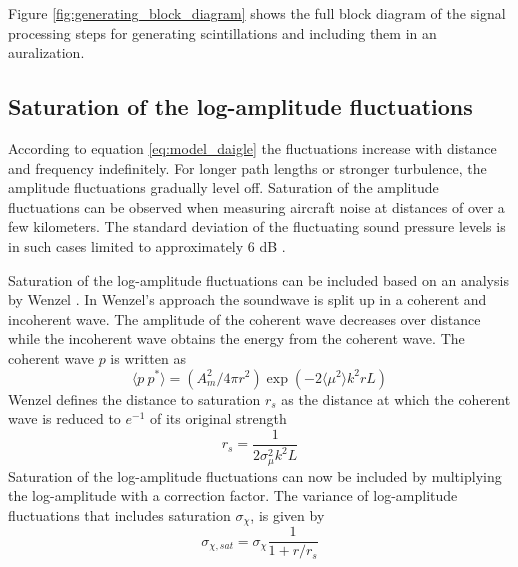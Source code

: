 Figure \ref{fig:generating_block_diagram} shows the full block diagram of the signal
processing steps for generating scintillations and including them in an auralization.


\subsection{Saturation of the log-amplitude fluctuations}
According to equation \eqref{eq:model_daigle} the fluctuations increase with distance and frequency indefinitely.
For longer path lengths or stronger turbulence, the amplitude fluctuations
gradually level off. Saturation of the amplitude fluctuations can be observed
when measuring aircraft noise at distances of over a few kilometers. The
standard deviation of the fluctuating sound pressure levels is in such cases
limited to approximately 6 dB \cite{Daigle1983}.

Saturation of the log-amplitude fluctuations can be included based on an analysis by Wenzel
\cite{Wenzel1975}. In Wenzel's approach the soundwave is split up in a coherent
and incoherent wave. The amplitude of the coherent wave decreases over distance
while the incoherent wave obtains the energy from the coherent wave. The
coherent wave $p$ is written as
\begin{equation}
 \langle p \  p^* \rangle = \left( A_m^2 / 4 \pi r^2 \right) \exp{\left( -2 \langle \mu^2 \rangle k^2 r L \right)}
\end{equation}
Wenzel defines the distance to saturation $r_s$ as the distance at which the coherent wave is reduced to $e^{-1}$ of its original strength
\begin{equation}\label{eq:saturation_distance}
 r_s = \frac{1}{2 \sigma_{\mu}^2 k^2 L}
\end{equation}
Saturation of the log-amplitude fluctuations can now be included by multiplying the log-amplitude with a correction factor.
The variance of log-amplitude fluctuations that includes saturation $\sigma_{\chi}$, is given by
\begin{equation}\label{eq:saturation_logamp}
 \sigma_{\chi, sat} = \sigma_{\chi} \frac{ 1}{1 + r/r_s}
\end{equation}

